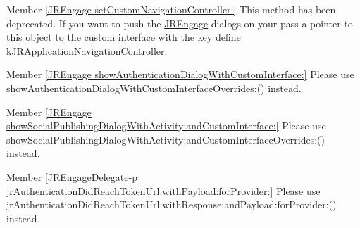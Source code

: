 \label{deprecated__deprecated000002}
\hypertarget{deprecated__deprecated000002}{}
 
\begin{DoxyDescription}
\item[Member \hyperlink{class_j_r_engage_a6c704bbff377d20603e6b52bd0ae17f1}{\mbox{[}JREngage setCustomNavigationController:\mbox{]}} ]This method has been deprecated. If you want to push the \hyperlink{class_j_r_engage}{JREngage} dialogs on your pass a pointer to this object to the custom interface with the key define \hyperlink{group__custom_interface_ga7bace8001f549fc2ecbe84d967d24d22}{kJRApplicationNavigationController}. 
\end{DoxyDescription}

\label{deprecated__deprecated000003}
\hypertarget{deprecated__deprecated000003}{}
 
\begin{DoxyDescription}
\item[Member \hyperlink{class_j_r_engage_ac8e1206be8608fbed548b7ec5f85e6e6}{\mbox{[}JREngage showAuthenticationDialogWithCustomInterface:\mbox{]}} ]Please use showAuthenticationDialogWithCustomInterfaceOverrides:() instead. 
\end{DoxyDescription}

\label{deprecated__deprecated000004}
\hypertarget{deprecated__deprecated000004}{}
 
\begin{DoxyDescription}
\item[Member \hyperlink{class_j_r_engage_af5c2aa40f5c45a22f369900d1bd81953}{\mbox{[}JREngage showSocialPublishingDialogWithActivity:andCustomInterface:\mbox{]}} ]Please use showSocialPublishingDialogWithActivity:andCustomInterfaceOverrides:() instead. 
\end{DoxyDescription}

\label{deprecated__deprecated000001}
\hypertarget{deprecated__deprecated000001}{}
 
\begin{DoxyDescription}
\item[Member \hyperlink{protocol_j_r_engage_delegate-p_abfafec7eed95008f7b7052d962f8f6fa}{\mbox{[}JREngageDelegate-\/p jrAuthenticationDidReachTokenUrl:withPayload:forProvider:\mbox{]}} ]Please use jrAuthenticationDidReachTokenUrl:withResponse:andPayload:forProvider:() instead. 
\end{DoxyDescription}